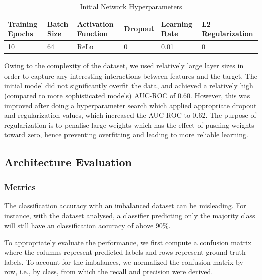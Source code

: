 \begin{table}[]
\begin{tabular}{|l|l|l|l|l|l|}
\hline
\rowcolor[HTML]{EFEFEF} 
\textbf{Training Epochs} & \textbf{Batch Size} & \textbf{Activation Function} & \textbf{Dropout} & \textbf{Learning Rate} & \textbf{L2 Regularization} \\ \hline
10                  & 64                  & ReLu                         & 0                & 0.01                   & 0                          \\ \hline
\end{tabular}
\caption[Part 2: Initial Network Hyperparameters]{Initial Network Hyperparameters}
\label{tab:part2initialnetworkparam}
\end{table}
\noindent Owing to the complexity of the dataset, we used relatively large layer sizes in order to capture any interesting interactions between features and the target. The initial model did not significantly overfit the data, and achieved a relatively high (compared to more sophisticated models) AUC-ROC of 0.60. However, this was improved after doing a hyperparameter search which applied appropriate dropout and regularization values, which increased the AUC-ROC to 0.62. The purpose of regularization is to penalise large weights which has the effect of pushing weights toward zero, hence preventing overfitting and leading to more reliable learning.

\subsection{Architecture Evaluation}
\subsubsection*{Metrics}
The classification accuracy with an imbalanced dataset can be misleading. For instance, with the dataset analysed, a classifier predicting only the majority class will still have an classification accuracy of above 90\%.

To appropriately evaluate the performance, we first compute a confusion matrix where the columns represent predicted labels and rows represent ground truth labels. To account for the imbalances, we normalized the confusion matrix by row, i.e., by class, from which the recall and precision were derived.

